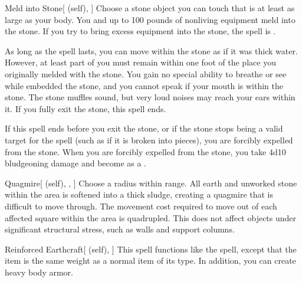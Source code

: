 \begin{ability}[\nth{2}]{Meld into Stone}[ (self), ]
Choose a stone object you can touch that is at least as large as your body.
You and up to 100 pounds of nonliving equipment meld into the stone.
If you try to bring excess equipment into the stone, the spell is .

As long as the spell lasts, you can move within the stone as if it was thick water.
However, at least part of you must remain within one foot of the place you originally melded with the stone.
You gain no special ability to breathe or see while embedded the stone, and you cannot speak if your mouth is within the stone.
The stone muffles sound, but very loud noises may reach your ears within it.
If you fully exit the stone, this spell ends.

If this spell ends before you exit the stone, or if the stone stops being a valid target for the spell (such as if it is broken into pieces), you are forcibly expelled from the stone.
When you are forcibly expelled from the stone, you take 4d10 bludgeoning damage and become  as a .
\end{ability}
\vspace{0.25em}



\begin{ability}[\nth{2}]{Quagmire}[ (self), , ]
Choose a \areamed radius within \rngmed range.
All earth and unworked stone within the area is softened into a thick sludge, creating a quagmire that is difficult to move through.
The movement cost required to move out of each affected square within the area is quadrupled.
This does not affect objects under significant structural stress, such as walls and support columns.
\end{ability}
\vspace{0.25em}



\begin{ability}[\nth{2}]{Reinforced Earthcraft}[ (self), ]
This spell functions like the  spell, except that the item is the same weight as a normal item of its type.
In addition, you can create heavy body armor.
\end{ability}
\vspace{0.25em}



